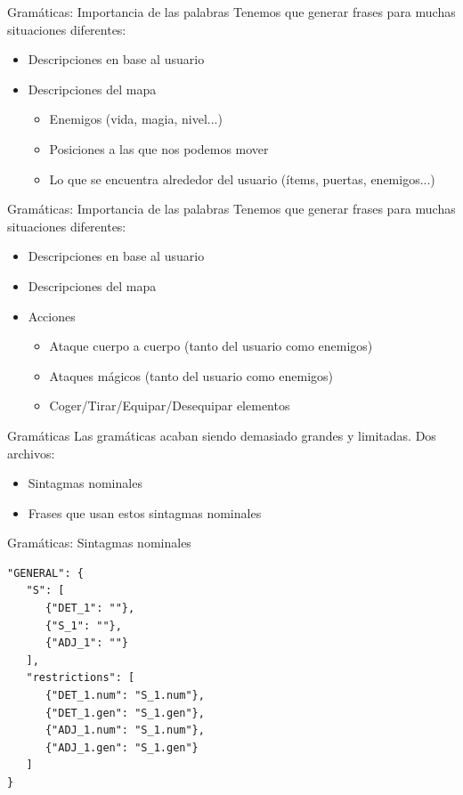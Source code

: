 \begin{frame}[t, fragile]{Gramáticas: Importancia de las palabras}
	Tenemos que generar frases para muchas situaciones diferentes:
	\begin{itemize}
		\item Descripciones en base al usuario
		\item<+-| alert@+> Descripciones del mapa
			\begin{itemize}
				\item Enemigos (vida, magia, nivel...)
				\item Posiciones a las que nos podemos mover
				\item Lo que se encuentra alrededor del usuario (ítems, puertas, enemigos...)
			\end{itemize}
	\end{itemize}
\end{frame}

\begin{frame}[t, fragile]{Gramáticas: Importancia de las palabras}
	Tenemos que generar frases para muchas situaciones diferentes:
	\begin{itemize}
		\item Descripciones en base al usuario
		\item Descripciones del mapa
		\item<+-| alert@+> Acciones
			\begin{itemize}
				\item Ataque cuerpo a cuerpo (tanto del usuario como enemigos)
				\item Ataques mágicos (tanto del usuario como enemigos)
				\item Coger/Tirar/Equipar/Desequipar elementos
			\end{itemize}
	\end{itemize}
\end{frame}

\begin{frame}[t, fragile]{Gramáticas}
	Las gramáticas acaban siendo demasiado grandes y limitadas. Dos archivos:
	\begin{itemize}
		\item<+-| alert@+> Sintagmas nominales
		\item Frases que usan estos sintagmas nominales
	\end{itemize}
\end{frame}

\begin{frame}[t, fragile]{Gramáticas: Sintagmas nominales}
	\begin{Verbatim}
"GENERAL": {
   "S": [
      {"DET_1": ""}, 
      {"S_1": ""},
      {"ADJ_1": ""}
   ],
   "restrictions": [
      {"DET_1.num": "S_1.num"},
      {"DET_1.gen": "S_1.gen"},
      {"ADJ_1.num": "S_1.num"},
      {"ADJ_1.gen": "S_1.gen"}
   ]
}
	\end{Verbatim}
\end{frame}

